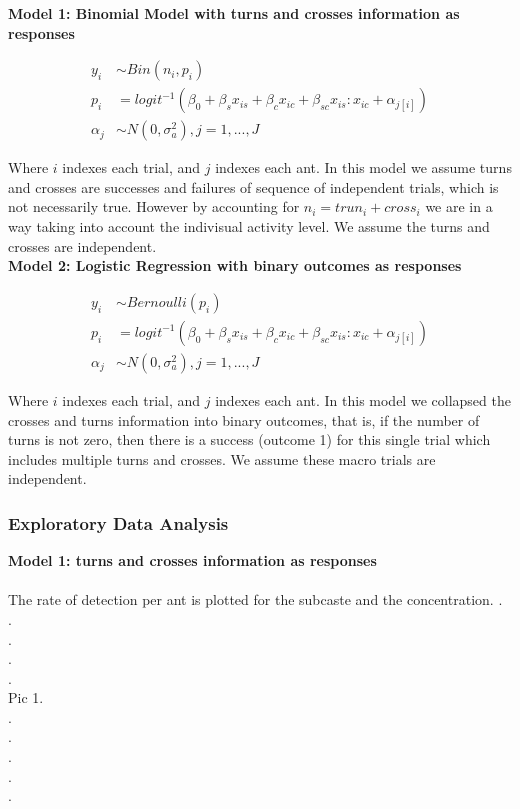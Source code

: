\documentclass{article}
\begin{document}
	\noindent\textbf{Model 1: Binomial Model with turns and crosses information as responses}  

	\begin{align*}
	y_i &\sim Bin(n_i,p_i)\\
	p_i &= logit^{-1}(\beta_0 + \beta_sx_{is} + \beta_cx_{ic} + \beta_{sc}x_{is}:x_{ic} + \alpha_{j[i]})\\
	\alpha_j &\sim N(0, \sigma^2_a),j=1,...,J
	\end{align*}
	
	Where $i$ indexes each trial, and $j$ indexes each ant. In this model we assume turns and crosses are successes and failures of sequence of independent trials, which is not necessarily true. However by accounting for $n_i = trun_i + cross_i$ we are in a way taking into account the indivisual activity level. We assume the turns and crosses are independent.  \\
	
	\noindent\textbf{Model 2: Logistic Regression with binary outcomes as responses}  
	
	\begin{align*}
	y_i &\sim Bernoulli(p_i)\\
	p_i &= logit^{-1}(\beta_0 + \beta_sx_{is} + \beta_cx_{ic} + \beta_{sc}x_{is}:x_{ic} + \alpha_{j[i]})\\
	\alpha_j &\sim N(0, \sigma^2_a),j=1,...,J
	\end{align*}  
	
	Where $i$ indexes each trial, and $j$ indexes each ant. In this model we collapsed the crosses and turns information into binary outcomes, that is, if the number of turns is not zero, then there is a success (outcome 1) for this single trial which includes multiple turns and crosses. We assume these macro trials are independent.
	
		\subsubsection{Exploratory Data Analysis}
		\noindent\textbf{Model 1: turns and crosses information as responses}\\\\
		The rate of detection per ant is plotted for the subcaste and the concentration. 
		.\\
		.\\
		.\\
		.\\
		.\\
		Pic 1.\\
		.\\
		.\\
		.\\
		.\\
		. 
		
\end{document}

